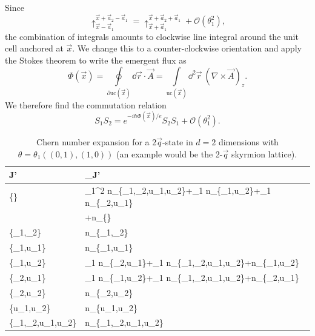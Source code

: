 \documentclass[
    10pt,
    aps,
    prb,
	longbibliography,
    twocolumn,
    floatfix,
    superscriptaddress,
]{revtex4-2}
\begin{document}
Since
\begin{equation}
	\uparrow_{\vec{x}-\vec{a}_1}^{\vec{x}+\vec{a}_2 -\vec{a}_1}
	=
	\uparrow_{\vec{x}+\vec{a}_1}^{\vec{x}+\vec{a}_2 +\vec{a}_1} + \mathcal{O}(\theta_1^2),
\end{equation}
the combination of integrals amounts to clockwise line integral around the unit cell  anchored at $\vec{x}$.
We change this to a counter-clockwise orientation and apply the Stokes theorem to write the emergent flux as
\begin{equation}
	\Phi(\vec{x}) = \oint\limits_{\partial \mathrm{uc}(\vec{x})} \dd\vec{r}\cdot \vec{A} = \int\limits_{\mathrm{uc}(\vec{x})} \dd^2\vec{r}~ (\nabla \times \vec{A})_z .
\end{equation}              
We therefore find the commutation relation
\begin{equation}
	S_1 S_2 = e^{-i\hbar \Phi(\vec{x})/ e} S_2 S_1 + \mathcal{O}(\theta_1^2).
\end{equation}    

\begin{table}[t]
	\begin{tabular}{L|L}
	J' & _{J'} \\ \toprule
	\{\} & \theta _1^2 n_{\left\{\tau _1,\tau _2,u_1,u_2\right\}}+\theta _1 n_{\left\{\tau _1,u_2\right\}}+\theta _1 n_{\left\{\tau _2,u_1\right\}} \\
	 & +n_{\{\}} \\
	\left\{\tau _1,\tau _2\right\} & n_{\left\{\tau _1,\tau _2\right\}} \\
	\left\{\tau _1,u_1\right\} & n_{\left\{\tau _1,u_1\right\}} \\
	\left\{\tau _1,u_2\right\} & \theta _1 n_{\left\{\tau _2,u_1\right\}}+\theta _1 n_{\left\{\tau _1,\tau _2,u_1,u_2\right\}}+n_{\left\{\tau _1,u_2\right\}} \\
	\left\{\tau _2,u_1\right\} & \theta _1 n_{\left\{\tau _1,u_2\right\}}+\theta _1 n_{\left\{\tau _1,\tau _2,u_1,u_2\right\}}+n_{\left\{\tau _2,u_1\right\}} \\
	\left\{\tau _2,u_2\right\} & n_{\left\{\tau _2,u_2\right\}} \\
	\left\{u_1,u_2\right\} & n_{\left\{u_1,u_2\right\}} \\
	\left\{\tau _1,\tau _2,u_1,u_2\right\} & n_{\left\{\tau _1,\tau _2,u_1,u_2\right\}}
	\end{tabular}
	\caption{Chern number expansion for a 2$\vec{q}$-state in $d=2$ dimensions with $\theta = \theta_1 ((0,1),(1,0))$ (an example would be the 2-$\vec{q}$ skyrmion lattice).
	}
	\label{tab:2q_2d}
	\end{table}
		
\end{document}
